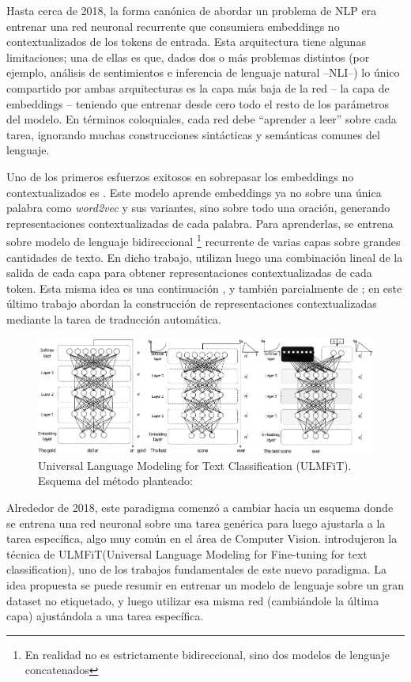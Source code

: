 Hasta cerca de 2018, la forma canónica de abordar un problema de NLP era entrenar una red neuronal recurrente que consumiera embeddings no contextualizados de los tokens de entrada. Esta arquitectura tiene algunas limitaciones; una de ellas es que, dados dos o más problemas distintos (por ejemplo, análisis de sentimientos e inferencia de lenguaje natural --NLI--) lo único compartido por ambas arquitecturas es la capa más baja de la red -- la capa de embeddings -- teniendo que entrenar desde cero todo el resto de los parámetros del modelo. En términos coloquiales, cada red debe ``aprender a leer'' sobre cada tarea, ignorando muchas construcciones sintácticas y semánticas comunes del lenguaje.

Uno de los primeros esfuerzos exitosos en sobrepasar los embeddings no contextualizados es \elmo{} \cite{peters2018}. Este modelo aprende embeddings ya no sobre una única palabra como \emph{word2vec} y sus variantes, sino sobre todo una oración, generando representaciones contextualizadas de cada palabra.  Para aprenderlas, \elmo{} se entrena sobre modelo de lenguaje bidireccional \footnote{En realidad no es estrictamente bidireccional, sino dos modelos de lenguaje concatenados} recurrente de varias capas sobre grandes cantidades de texto. En dicho trabajo, utilizan luego una combinación lineal de la salida de cada capa para obtener representaciones contextualizadas de cada token. Esta misma idea es una continuación \citet{peters2017semi}, y también parcialmente de \citet{mccann2017learned}; en este último trabajo abordan la construcción de representaciones contextualizadas mediante la tarea de traducción automática.

\begin{figure}[t]
    \centering
    \includegraphics[width=\textwidth]{img/02/ulmfit.pdf}
    \caption{Universal Language Modeling for Text Classification (ULMFiT). Esquema del método planteado:}
    \label{fig:ulmfit}
\end{figure}

Alrededor de 2018, este paradigma comenzó a cambiar hacia un esquema donde se entrena una red neuronal sobre una tarea genérica para luego ajustarla a la tarea específica, algo muy común en el área de Computer Vision. \citet{howard-ruder-2018-universal} introdujeron la técnica de ULMFiT(Universal Language Modeling for Fine-tuning for text classification), uno de los trabajos fundamentales de este nuevo paradigma. La idea propuesta se puede resumir en entrenar un modelo de lenguaje sobre un gran dataset no etiquetado, y luego utilizar esa misma red (cambiándole la última capa) ajustándola a una tarea específica.

